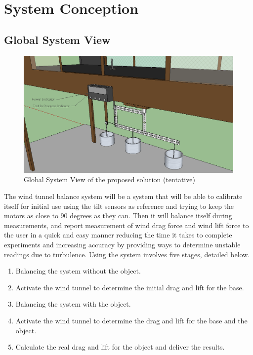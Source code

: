 \section{System Conception}
	\subsection{Global System View}

		\begin{figure}[H]
			\centering
				\includegraphics[scale=0.40]{img/globalview}
			\caption{Global System View of the proposed solution (tentative)}
		\end{figure}

		The wind tunnel balance system will be a system that will be able to calibrate itself for initial use using the tilt sensors as reference and trying to keep the motors as close to 90 degrees as they can. Then it will balance itself during measurements, and report measurement of wind drag force and wind lift force to the user in a quick and easy manner reducing the time it takes to complete experiments and increasing accuracy by providing ways to determine unstable readings due to turbulence. Using the system involves five stages, detailed below.
		
		\begin{enumerate}
			\item Balancing the system without the object.
			\item Activate the wind tunnel to determine the initial drag and lift for the base.
			\item Balancing the system with the object.
			\item Activate the wind tunnel to determine the drag and lift for the base and the object.
			\item Calculate the real drag and lift for the object and deliver the results.
		\end{enumerate}

